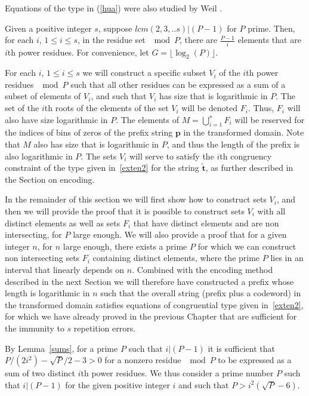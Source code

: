 Equations of the type in (\ref{hua}) were also studied by Weil
\cite{weil:49}.

Given a positive integer $s$, suppose $lcm(2,3,..s) | (P-1)$ for
$P$ prime. Then, for each $i$, $1 \leq i \leq s$, in the residue
set $\mod P$, there are $\frac{P-1}{i}$ elements that are $i$th
power residues. For convenience, let $G = \lfloor \log_2(P)
\rfloor$.

For each $i$, $1 \leq i \leq s$ we will construct a specific
subset $V_i$ of the $i$th power residues $\mod P$ such that all
other residues can be expressed as a sum of a subset  of elements
of $V_i$, and such that $V_i$ has size that is logarithmic in $P$.
The set of the $i$th roots of the elements of the set $V_i$ will
be denoted $F_i$. Thus, $F_i$ will also have size logarithmic in
$P$. The elements of $M =\bigcup_{i=1}^s F_i$ will be reserved for
the indices of bins of zeros of the prefix string $\mathbf{p}$ in
the transformed domain. Note that $M$ also has size that is
logarithmic in $P$, and thus the length of the prefix is also
logarithmic in $P$. The sets $V_i$ will serve to satisfy the $i$th
congruency constraint of the type given in~\eqref{exten2} for the
string $\mathbf{\tilde{t}}$, as further described in the Section
on encoding.

In the remainder of this section we will first show how to
construct sets $V_i$, and then we will provide the proof that it
is possible to construct sets $V_i$ with all distinct elements as
well as  sets $F_i$ that have distinct elements and are non
intersecting, for $P$ large enough. We will also provide a proof
that for a given integer $n$, for $n$ large enough, there exists a
prime $P$ for which we can construct non intersecting sets $F_i$
containing distinct elements, where the prime $P$ lies in an
interval that linearly depends on $n$. Combined with the encoding
method described in the next Section we will therefore have
constructed a prefix whose length is logarithmic in $n$ such that
the overall string (prefix plus a codeword) in the transformed
domain satisfies equations of congruential type given
in~\eqref{exten2}, for which we have already proved in the
previous Chapter that are sufficient for the immunity to $s$
repetition errors.


By Lemma~\ref{sums}, for a prime $P$ such that $i| (P-1)$ it is
sufficient that $P/(2i^2)-\sqrt{P}/2-3>0$ for a nonzero residue
$\mod P$ to be expressed as a sum of two distinct $i$th power
residues. We thus consider a prime number $P$ such that $i|(P-1)$
for the given positive integer $i$ and such that
$P>i^2(\sqrt{P}-6)$.

